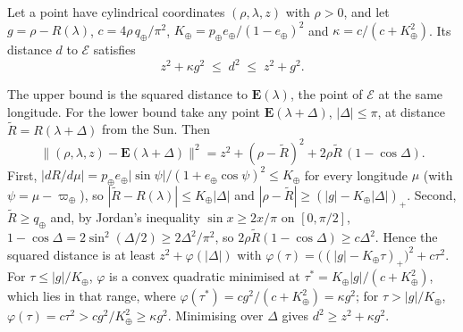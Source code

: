 \begin{lemma}\label{lem:bracket}
Let a point have cylindrical coordinates $(\rho, \lambda, z)$ with $\rho > 0$, and let $g = \rho - R(\lambda)$, $c = 4\rho\,q_\oplus/\pi^2$, $K_\oplus = p_\oplus e_\oplus/(1 - e_\oplus)^2$ and $\kappa = c/(c + K_\oplus^2)$. Its distance $d$ to $\mathcal{E}$ satisfies
\[
z^2 + \kappa g^2 \;\le\; d^2 \;\le\; z^2 + g^2 .
\]
\end{lemma}
\begin{IEEEproof}
The upper bound is the squared distance to $\mathbf{E}(\lambda)$, the point of $\mathcal{E}$ at the same longitude. For the lower bound take any point $\mathbf{E}(\lambda + \Delta)$, $|\Delta| \le \pi$, at distance $\tilde R = R(\lambda + \Delta)$ from the Sun. Then
\[
\lVert(\rho,\lambda,z) - \mathbf{E}(\lambda+\Delta)\rVert^2 = z^2 + (\rho - \tilde R)^2 + 2\rho\tilde R\,(1 - \cos\Delta).
\]
First, $|dR/d\mu| = p_\oplus e_\oplus|\sin\psi|/(1 + e_\oplus\cos\psi)^2 \le K_\oplus$ for every longitude $\mu$ (with $\psi = \mu - \varpi_\oplus$), so $|\tilde R - R(\lambda)| \le K_\oplus|\Delta|$ and $|\rho - \tilde R| \ge (|g| - K_\oplus|\Delta|)_+$. Second, $\tilde R \ge q_\oplus$ and, by Jordan's inequality $\sin x \ge 2x/\pi$ on $[0, \pi/2]$, $1 - \cos\Delta = 2\sin^2(\Delta/2) \ge 2\Delta^2/\pi^2$, so $2\rho\tilde R(1 - \cos\Delta) \ge c\Delta^2$. Hence the squared distance is at least $z^2 + \varphi(|\Delta|)$ with $\varphi(\tau) = \bigl((|g| - K_\oplus\tau)_+\bigr)^2 + c\tau^2$. For $\tau \le |g|/K_\oplus$, $\varphi$ is a convex quadratic minimised at $\tau^* = K_\oplus|g|/(c + K_\oplus^2)$, which lies in that range, where $\varphi(\tau^*) = c g^2/(c + K_\oplus^2) = \kappa g^2$; for $\tau > |g|/K_\oplus$, $\varphi(\tau) = c\tau^2 > c g^2/K_\oplus^2 \ge \kappa g^2$. Minimising over $\Delta$ gives $d^2 \ge z^2 + \kappa g^2$.
\end{IEEEproof}


